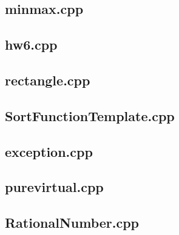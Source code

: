     \subsection{minmax.cpp}
        
    \subsection{hw6.cpp}
        
    \subsection{rectangle.cpp}
        
    \subsection{SortFunctionTemplate.cpp}
        
    \subsection{exception.cpp}
        
    \subsection{purevirtual.cpp}
        
    \subsection{RationalNumber.cpp}
        